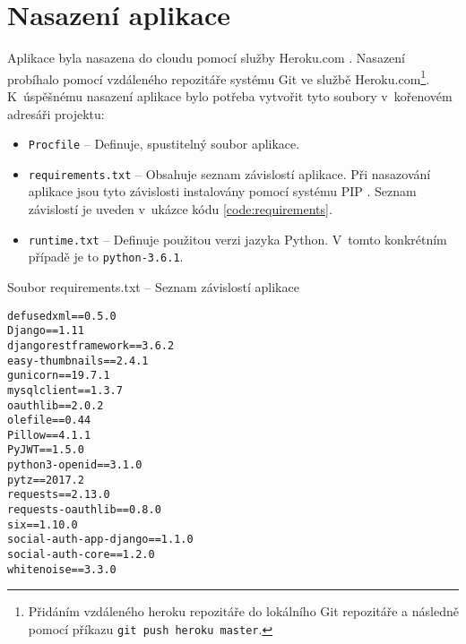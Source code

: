 \section{Nasazení aplikace}
\label{deploy}

Aplikace byla nasazena do cloudu pomocí služby Heroku.com \cite{heroku}. Nasazení probíhalo pomocí vzdáleného repozitáře systému Git ve službě Heroku.com\footnote{Přidáním vzdáleného heroku repozitáře do lokálního Git repozitáře a následně pomocí příkazu \texttt{git push heroku master}.}. K~úspěšnému nasazení aplikace bylo potřeba vytvořit tyto soubory v~kořenovém adresáři projektu:
\begin{itemize}
    \item \texttt{Procfile} -- Definuje, spustitelný soubor aplikace.
    \item \texttt{requirements.txt} -- Obsahuje seznam závislostí aplikace. Při nasazování aplikace jsou tyto závislosti instalovány pomocí systému PIP \cite{pip}. Seznam závislostí je uveden v~ukázce kódu \ref{code:requirements}.
    \item \texttt{runtime.txt} -- Definuje použitou verzi jazyka Python. V~tomto konkrétním případě je to \texttt{python-3.6.1}.
\end{itemize}

\begin{listing}[h]
\caption{\label{code:requirements}Soubor requirements.txt -- Seznam závislostí aplikace}
\begin{verbatim}
defusedxml==0.5.0
Django==1.11
djangorestframework==3.6.2
easy-thumbnails==2.4.1
gunicorn==19.7.1
mysqlclient==1.3.7
oauthlib==2.0.2
olefile==0.44
Pillow==4.1.1
PyJWT==1.5.0
python3-openid==3.1.0
pytz==2017.2
requests==2.13.0
requests-oauthlib==0.8.0
six==1.10.0
social-auth-app-django==1.1.0
social-auth-core==1.2.0
whitenoise==3.3.0
\end{verbatim}
\end{listing}